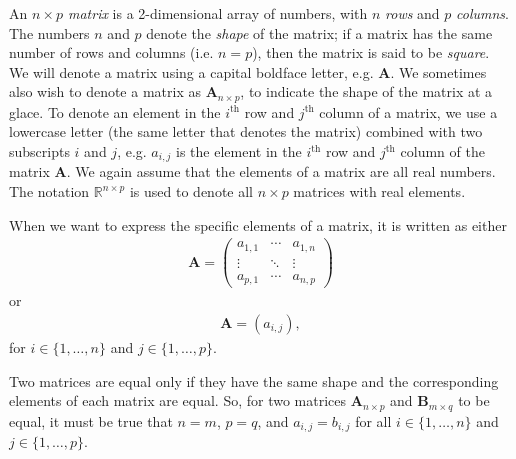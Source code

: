 \documentclass[10pt]{article}
\newcommand{\mydef}[1]{\textcolor{SteelBlue3}{\textit{#1}}} %
\begin{document}

An \mydef{$n \times p$ matrix} is a 2-dimensional array of numbers, with $n$ \mydef{rows} and $p$ \mydef{columns}. The numbers $n$ and $p$ denote the \mydef{shape} of the matrix; if a matrix has the same number of rows and columns (i.e. $n = p$), then the matrix is said to be \mydef{square}. We will denote a matrix using a capital boldface letter, e.g. $\mathbf{A}$. We sometimes also wish to denote a matrix as $\mathbf{A}_{n \times p}$, to indicate the shape of the matrix at a glace. To denote an element in the $i^{\text{th}}$ row and $j^{\text{th}}$ column of a matrix, we use a lowercase letter (the same letter that denotes the matrix) combined with two subscripts $i$ and $j$, e.g. $a_{i,j}$ is the element in the $i^{\text{th}}$ row and $j^{\text{th}}$ column of the matrix $\mathbf{A}$. We again assume that the elements of a matrix are all real numbers. The notation $\mathbb{R}^{n \times p}$ is used to denote all $n \times p$ matrices with real elements. 

When we want to express the specific elements of a matrix, it is written as either 
\begin{align}
    \mathbf{A} = \begin{pmatrix}
        a_{1,1} & \cdots & a_{1,n} \\
        \vdots & \ddots & \vdots \\
        a_{p,1} & \cdots & a_{n,p}
    \end{pmatrix} \label{eq4}
\end{align}
or 
\begin{align}
    \mathbf{A} = (a_{i,j}), \label{eq5}
\end{align}
for $i \in \{ 1,\ldots,n \}$ and $j \in \{ 1,\ldots,p \}$. 

Two matrices are equal only if they have the same shape and the corresponding elements of each matrix are equal. So, for two matrices $\mathbf{A}_{n \times p}$ and $\mathbf{B}_{m \times q}$ to be equal, it must be true that $n = m$, $p = q$, and $a_{i,j} = b_{i,j}$ for all $i \in \{ 1,\ldots,n \}$ and $j \in \{ 1,\ldots,p \}$.
\end{document}
